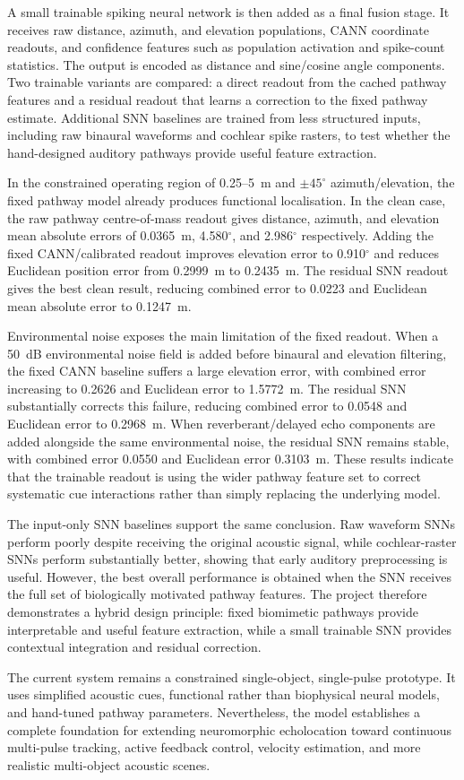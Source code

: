 A small trainable spiking neural network is then added as a final fusion stage. It receives raw distance, azimuth, and elevation populations, CANN coordinate readouts, and confidence features such as population activation and spike-count statistics. The output is encoded as distance and sine/cosine angle components. Two trainable variants are compared: a direct readout from the cached pathway features and a residual readout that learns a correction to the fixed pathway estimate. Additional SNN baselines are trained from less structured inputs, including raw binaural waveforms and cochlear spike rasters, to test whether the hand-designed auditory pathways provide useful feature extraction.

In the constrained operating region of 0.25--5~m and $\pm45^\circ$ azimuth/elevation, the fixed pathway model already produces functional localisation. In the clean case, the raw pathway centre-of-mass readout gives distance, azimuth, and elevation mean absolute errors of 0.0365~m, 4.580$^\circ$, and 2.986$^\circ$ respectively. Adding the fixed CANN/calibrated readout improves elevation error to 0.910$^\circ$ and reduces Euclidean position error from 0.2999~m to 0.2435~m. The residual SNN readout gives the best clean result, reducing combined error to 0.0223 and Euclidean mean absolute error to 0.1247~m.

Environmental noise exposes the main limitation of the fixed readout. When a 50~dB environmental noise field is added before binaural and elevation filtering, the fixed CANN baseline suffers a large elevation error, with combined error increasing to 0.2626 and Euclidean error to 1.5772~m. The residual SNN substantially corrects this failure, reducing combined error to 0.0548 and Euclidean error to 0.2968~m. When reverberant/delayed echo components are added alongside the same environmental noise, the residual SNN remains stable, with combined error 0.0550 and Euclidean error 0.3103~m. These results indicate that the trainable readout is using the wider pathway feature set to correct systematic cue interactions rather than simply replacing the underlying model.

The input-only SNN baselines support the same conclusion. Raw waveform SNNs perform poorly despite receiving the original acoustic signal, while cochlear-raster SNNs perform substantially better, showing that early auditory preprocessing is useful. However, the best overall performance is obtained when the SNN receives the full set of biologically motivated pathway features. The project therefore demonstrates a hybrid design principle: fixed biomimetic pathways provide interpretable and useful feature extraction, while a small trainable SNN provides contextual integration and residual correction.

The current system remains a constrained single-object, single-pulse prototype. It uses simplified acoustic cues, functional rather than biophysical neural models, and hand-tuned pathway parameters. Nevertheless, the model establishes a complete foundation for extending neuromorphic echolocation toward continuous multi-pulse tracking, active feedback control, velocity estimation, and more realistic multi-object acoustic scenes.
